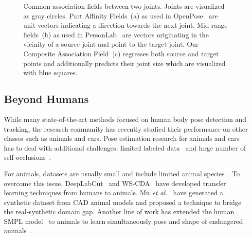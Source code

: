 \documentclass[journal]{IEEEtran}
\begin{document}
\begin{figure}[t]
  \centering
  \hspace{0.5cm}
  \hspace{0.5cm}
  \caption{
    Common association fields between two joints.
    Joints are visualized as gray circles.
    Part Affinity Fields~(a)
    as used in OpenPose~\cite{cao2017realtime}
    are unit vectors indicating a direction towards the next joint.
    Mid-range fields~(b) as used in PersonLab~\cite{papandreou2018personlab}
    are vectors originating
    in the vicinity of a source joint and point to the target joint.
    Our Composite Association Field~(c) regresses both source and target
    points and additionally predicts their joint size
    which are visualized with blue squares.
  }
  \label{fig:association-fields}
\end{figure}



\subsection{Beyond Humans}

While many state-of-the-art methods focused on human body pose detection and tracking, the research community has recently studied their performance on other classes such as animals and cars. Pose estimation research for animals and cars has to deal with additional challenges: limited labeled data~\cite{cao2019cross} and large number of self-occlusions~\cite{reddy2019occlusion}.

For animals, datasets are usually small and include limited animal
species~\cite{pereira2019fast, cao2019cross, biggs2020left,tigers2020, horses2021}.
To overcome this issue, DeepLabCut~\cite{mathis2018deeplabcut} and
WS-CDA~\cite{cao2019cross} have developed transfer learning techniques from
humans to animals. Mu \textit{et al.}~\cite{mu2020learning} have generated a
synthetic dataset from CAD animal models and proposed a technique to bridge the
real-synthetic domain gap. Another line of work has extended the human SMPL
model~\cite{loper2015smpl} to animals to learn simultaneously pose and shape of
endangered animals~\cite{zuffi2018lions, biggs2018creatures, zuffi2019three}.
\end{document}
